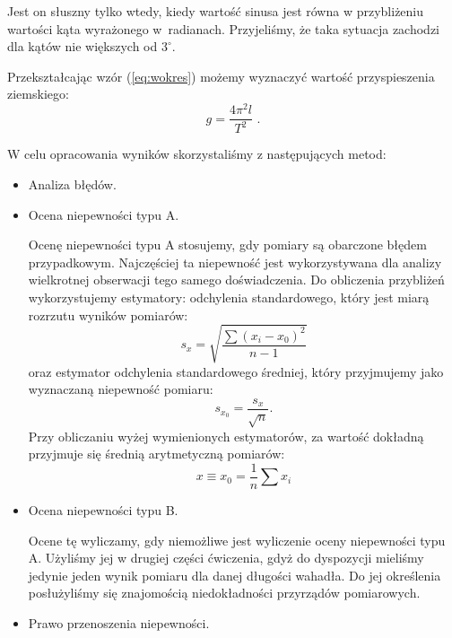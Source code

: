 \documentclass [a4paper,11pt]{article}
\begin{document}
	Jest on słuszny tylko wtedy, kiedy wartość sinusa jest równa w przybliżeniu wartości kąta wyrażonego w~radianach.
	Przyjeliśmy, że taka sytuacja zachodzi dla kątów nie większych od $3^\circ$.
	
	Przekształcając wzór (\ref{eq:wokres}) możemy wyznaczyć wartość przyspieszenia ziemskiego:
	\begin{equation}
	\label{eq:wprzysp} 
	g= \frac{4 \pi^2 l}{T^2} \text{ .}
	\end{equation}
	
	W celu opracowania wyników skorzystaliśmy z następujących metod:
	\begin{itemize}
		\item Analiza błędów.
		\item Ocena niepewności typu A.
		
		Ocenę niepewności typu A stosujemy, gdy pomiary są obarczone błędem przypadkowym. Najczęściej ta niepewność jest wykorzystywana dla analizy wielkrotnej obserwacji tego samego doświadczenia. Do obliczenia przybliżeń wykorzystujemy estymatory: odchylenia standardowego, który jest miarą rozrzutu wyników pomiarów:
		\begin{equation}
		\label{eq:estymator}
		s_x = \sqrt{\frac{\sum (x_i -x_0)^2}{n-1}}
		\end{equation}
		oraz estymator odchylenia standardowego średniej, który przyjmujemy jako wyznaczaną niepewność pomiaru:
		\begin{equation}
			\label{eq:estymatorsredniej}
			s_{x_0}=\frac{s_x}{\sqrt{n}} \text{.}
		\end{equation}
		Przy obliczaniu wyżej wymienionych estymatorów, za wartość dokładną przyjmuje się średnią arytmetyczną pomiarów:
		\begin{equation}
		\label{eq:wstepsrednia}
		x \equiv x_0 = \frac{1}{n}\sum x_i
		\end{equation}
		
		\item Ocena niepewności typu B.
		
		Ocene tę wyliczamy, gdy niemożliwe jest wyliczenie oceny niepewności typu A. Użyliśmy jej w drugiej części ćwiczenia, gdyż do dyspozycji mieliśmy jedynie jeden wynik pomiaru dla danej długości wahadła. Do jej określenia posłużyliśmy się znajomością niedokładności przyrządów pomiarowych.
		
		\item Prawo przenoszenia niepewności.
		

\end{itemize}
\end{document}
